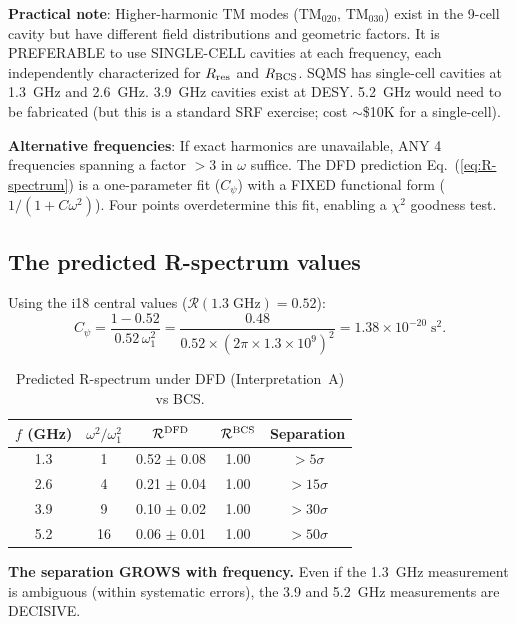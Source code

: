 \documentclass[11pt]{article}
\newcommand{\ee}[1]{\times 10^{#1}}
\theoremstyle{definition}
\theoremstyle{remark}
\begin{document}
\textbf{Practical note}: Higher-harmonic TM modes (TM$_{020}$,
TM$_{030}$) exist in the 9-cell cavity but have different field
distributions and geometric factors. It is PREFERABLE to use
SINGLE-CELL cavities at each frequency, each independently
characterized for $R_{\rm res}$ and $R_{\rm BCS}$. SQMS has
single-cell cavities at 1.3~GHz and 2.6~GHz. 3.9~GHz cavities
exist at DESY. 5.2~GHz would need to be fabricated (but this is
a standard SRF exercise; cost $\sim$\$10K for a single-cell).

\textbf{Alternative frequencies}: If exact harmonics are unavailable,
ANY 4 frequencies spanning a factor $>3$ in $\omega$ suffice.
The DFD prediction Eq.~(\ref{eq:R-spectrum}) is a one-parameter
fit ($C_\psi$) with a FIXED functional form ($1/(1 + C\omega^2)$).
Four points overdetermine this fit, enabling a $\chi^2$ goodness
test.

\subsection{The predicted R-spectrum values}

Using the i18 central values ($\mathcal{R}(1.3\;\text{GHz}) = 0.52$):
\begin{equation}
C_\psi = \frac{1 - 0.52}{0.52\,\omega_1^2}
= \frac{0.48}{0.52 \times (2\pi \times 1.3\ee{9})^2}
= 1.38\ee{-20}\;\text{s}^2.
\end{equation}

\begin{table}[H]
\centering
\caption{Predicted R-spectrum under DFD (Interpretation~A) vs BCS.}
\label{tab:R-spectrum}
\renewcommand{\arraystretch}{1.3}
\begin{tabular}{@{}ccccc@{}}
\toprule
$f$ (GHz) & $\omega^2/\omega_1^2$ & $\mathcal{R}^{\rm DFD}$
& $\mathcal{R}^{\rm BCS}$ & Separation \\
\midrule
1.3 & 1 & 0.52 $\pm$ 0.08 & 1.00 & $>5\sigma$ \\
2.6 & 4 & 0.21 $\pm$ 0.04 & 1.00 & $>15\sigma$ \\
3.9 & 9 & 0.10 $\pm$ 0.02 & 1.00 & $>30\sigma$ \\
5.2 & 16 & 0.06 $\pm$ 0.01 & 1.00 & $>50\sigma$ \\
\bottomrule
\end{tabular}
\end{table}

\textbf{The separation GROWS with frequency.} Even if the 1.3~GHz
measurement is ambiguous (within systematic errors), the 3.9 and
5.2~GHz measurements are DECISIVE.
\end{document}
